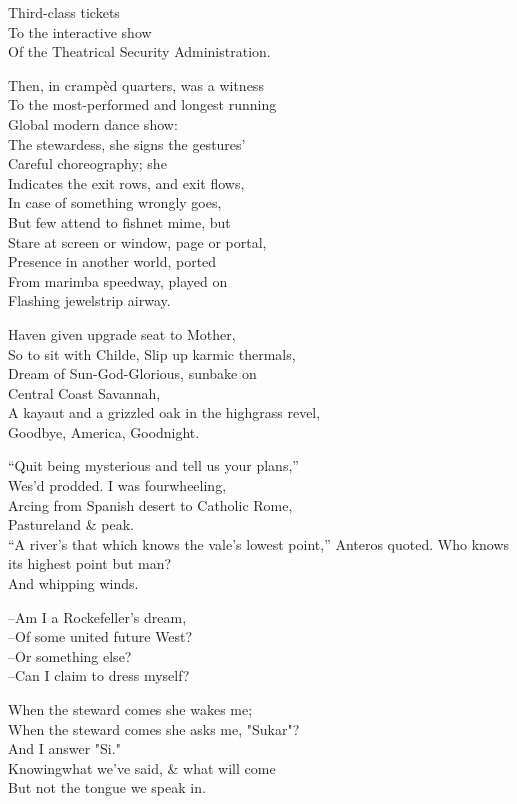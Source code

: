 Third-class tickets \\
To the interactive show \\
Of the Theatrical Security Administration.

Then, in crampèd quarters, was a witness \\
To the most-performed and longest running \\
Global modern dance show: \\
The stewardess, she signs the gestures' \\
Careful choreography; she \\
Indicates the exit rows, and exit flows, \\
In case of something wrongly goes, \\ 
But few attend to fishnet mime, but \\
Stare at screen or window, page or portal, \\
Presence in another world, ported \\
From marimba speedway, played on \\
Flashing jewelstrip airway.

Haven given upgrade seat to Mother, \\
So to sit with Childe, Slip up karmic thermals, \\ 
Dream of Sun-God-Glorious, sunbake on \\
Central Coast Savannah, \\
A kayaut and a grizzled oak in the highgrass revel, \\
Goodbye, America, Goodnight.

``Quit being mysterious and tell us your plans,'' \\
Wes'd prodded. I was fourwheeling, \\
Arcing from Spanish desert to Catholic Rome, \\
Pastureland \& peak. \\
``A river's that which knows the vale's lowest point,'' 
Anteros quoted. Who knows its highest point but man? \\
And whipping winds.

--Am I a Rockefeller's dream, \\
--Of some united future West? \\
--Or something else? \\
--Can I claim to dress myself?

When the steward comes she wakes me; \\
When the steward comes she asks me, "Sukar"? \\
And I answer "Si." \\
Knowingwhat we've said, \& what will come \\
But not the tongue we speak in.